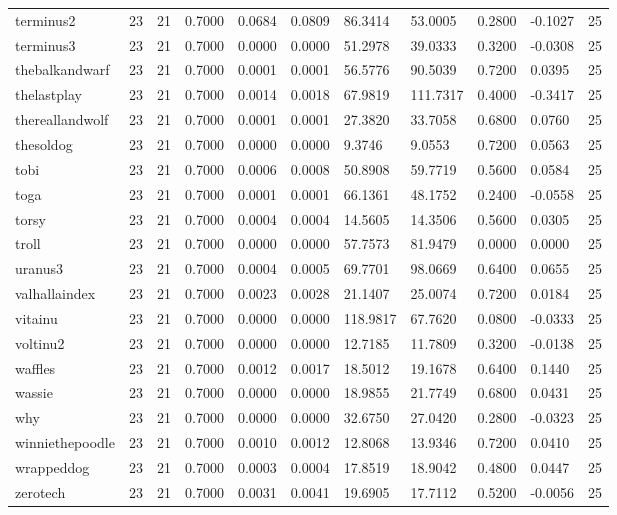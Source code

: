 \begin{table}[htbp]
\begin{tabular}{lllllllllll}
terminus2 & 23 & 21 & 0.7000 & 0.0684 & 0.0809 & 86.3414 & 53.0005 & 0.2800 & -0.1027 & 25 \\
terminus3 & 23 & 21 & 0.7000 & 0.0000 & 0.0000 & 51.2978 & 39.0333 & 0.3200 & -0.0308 & 25 \\
thebalkandwarf & 23 & 21 & 0.7000 & 0.0001 & 0.0001 & 56.5776 & 90.5039 & 0.7200 & 0.0395 & 25 \\
thelastplay & 23 & 21 & 0.7000 & 0.0014 & 0.0018 & 67.9819 & 111.7317 & 0.4000 & -0.3417 & 25 \\
thereallandwolf & 23 & 21 & 0.7000 & 0.0001 & 0.0001 & 27.3820 & 33.7058 & 0.6800 & 0.0760 & 25 \\
thesoldog & 23 & 21 & 0.7000 & 0.0000 & 0.0000 & 9.3746 & 9.0553 & 0.7200 & 0.0563 & 25 \\
tobi & 23 & 21 & 0.7000 & 0.0006 & 0.0008 & 50.8908 & 59.7719 & 0.5600 & 0.0584 & 25 \\
toga & 23 & 21 & 0.7000 & 0.0001 & 0.0001 & 66.1361 & 48.1752 & 0.2400 & -0.0558 & 25 \\
torsy & 23 & 21 & 0.7000 & 0.0004 & 0.0004 & 14.5605 & 14.3506 & 0.5600 & 0.0305 & 25 \\
troll & 23 & 21 & 0.7000 & 0.0000 & 0.0000 & 57.7573 & 81.9479 & 0.0000 & 0.0000 & 25 \\
uranus3 & 23 & 21 & 0.7000 & 0.0004 & 0.0005 & 69.7701 & 98.0669 & 0.6400 & 0.0655 & 25 \\
valhallaindex & 23 & 21 & 0.7000 & 0.0023 & 0.0028 & 21.1407 & 25.0074 & 0.7200 & 0.0184 & 25 \\
vitainu & 23 & 21 & 0.7000 & 0.0000 & 0.0000 & 118.9817 & 67.7620 & 0.0800 & -0.0333 & 25 \\
voltinu2 & 23 & 21 & 0.7000 & 0.0000 & 0.0000 & 12.7185 & 11.7809 & 0.3200 & -0.0138 & 25 \\
waffles & 23 & 21 & 0.7000 & 0.0012 & 0.0017 & 18.5012 & 19.1678 & 0.6400 & 0.1440 & 25 \\
wassie & 23 & 21 & 0.7000 & 0.0000 & 0.0000 & 18.9855 & 21.7749 & 0.6800 & 0.0431 & 25 \\
why & 23 & 21 & 0.7000 & 0.0000 & 0.0000 & 32.6750 & 27.0420 & 0.2800 & -0.0323 & 25 \\
winniethepoodle & 23 & 21 & 0.7000 & 0.0010 & 0.0012 & 12.8068 & 13.9346 & 0.7200 & 0.0410 & 25 \\
wrappeddog & 23 & 21 & 0.7000 & 0.0003 & 0.0004 & 17.8519 & 18.9042 & 0.4800 & 0.0447 & 25 \\
zerotech & 23 & 21 & 0.7000 & 0.0031 & 0.0041 & 19.6905 & 17.7112 & 0.5200 & -0.0056 & 25 \\

\end{tabular}
\end{table}
